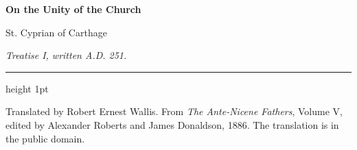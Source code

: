 \documentclass[11pt,letterpaper]{article}
\begin{document}
\color{ink}

\begin{center}
{\LARGE\bfseries\color{heading} On the Unity of the Church\par}
\vspace{1.2em}
{\large St. Cyprian of Carthage\par}
\vspace{0.6em}
{\itshape\color{subhead} Treatise I, written A.D. 251.\par}
\vspace{0.4em}
{\color{accent}\hrule height 1pt}
\end{center}
\vspace{1em}



\vspace{2em}
{\small\noindent Translated by Robert Ernest Wallis. From \emph{The Ante-Nicene
Fathers}, Volume V, edited by Alexander Roberts and James Donaldson, 1886.
The translation is in the public domain.\par}
\end{document}
